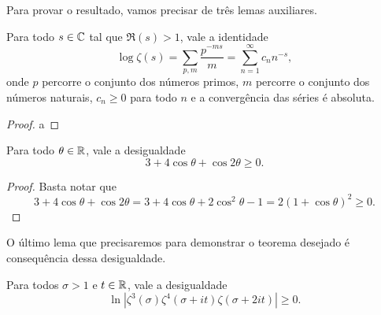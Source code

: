     Para provar o resultado, vamos precisar de três lemas
    auxiliares.
    \begin{lema}
    \label{lema-log-zeta}
        Para todo $s\in\mathbb{C}$ tal que $\Re(s)>1$, vale a identidade
        \[
        \log\zeta(s) = \sum_{p,m} \frac{p^{-ms}}{m} 
                     = \sum_{n=1}^{\infty} c_nn^{-s},
        \]
        onde $p$ percorre o conjunto dos números primos, 
        $m$ percorre o conjunto dos números naturais,
        $c_n\geq 0$ para todo $n$ e a convergência das séries
        é absoluta.
    \end{lema}
    \begin{proof}
        a
    \end{proof}
    \begin{lema}
    \label{lema-des-cosseno}
        Para todo $\theta\in\mathbb{R}$, vale a desigualdade
        \[
        3 + 4\cos\theta + \cos 2\theta \geq 0.
        \]
    \end{lema}
    \begin{proof}
        Basta notar que
        \[
        3 + 4\cos\theta + \cos 2\theta 
        = 3 + 4\cos\theta + 2\cos^2\theta - 1
        = 2(1 + \cos\theta)^2 \geq 0.
        \]
    \end{proof}
    O último lema que precisaremos para demonstrar o 
    teorema desejado é consequência dessa desigualdade.
    \begin{lema}
    \label{lema-log-produto-zetas}
        Para todos $\sigma>1$ e $t\in\mathbb{R}$, vale a desigualdade
        \[
        \ln|\zeta^3(\sigma)\zeta^4(\sigma + it)\zeta(\sigma + 2it)|
        \geq 0.
        \]
    \end{lema}
